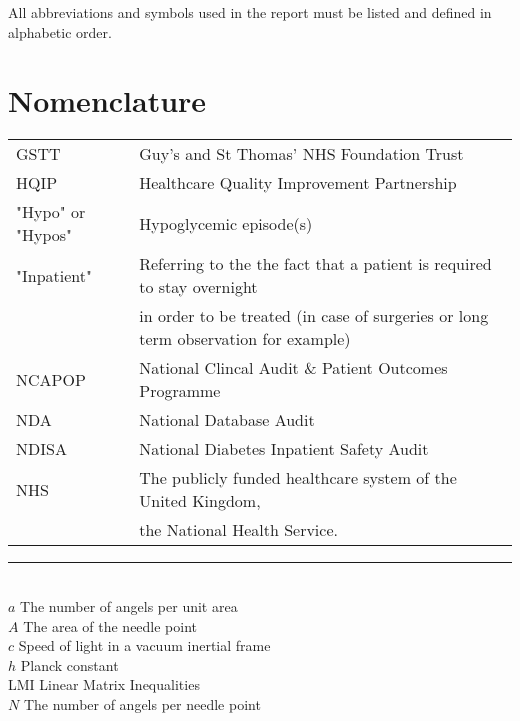  All abbreviations and symbols used in the report must be listed and defined in alphabetic order.

\section*{Nomenclature}

\begin{flushleft}
\begin{minipage}{1\textwidth}
    	\centering
        \def\arraystretch{1.25}%
    	\begin{tabular}{ll}


			GSTT  & Guy's and St Thomas' NHS Foundation Trust \\
			HQIP & Healthcare Quality Improvement Partnership \\
			"Hypo" or "Hypos" & Hypoglycemic episode(s) \\

			"Inpatient" & Referring to the the fact that a patient is required to stay overnight \\
			& in order to be treated (in case of surgeries or long term observation for example) \\ 

			NCAPOP & National Clincal Audit \& Patient Outcomes Programme \\
			NDA   & National Database Audit  \\
    		NDISA & National Diabetes Inpatient Safety Audit \\  
    		NHS & The publicly funded healthcare system of the United Kingdom, \\ 
            & the National Health Service. \\
			
      
                
    	\end{tabular}
\end{minipage}

\end{flushleft}

\noindent\rule{8cm}{0.4pt} \\ %
$a$ \qquad The number of angels per unit area\\
$A$ \qquad The area of the needle point\\
$c$ \qquad Speed of light in a vacuum inertial frame\\
$h$ \qquad Planck constant\\
LMI	\qquad Linear Matrix Inequalities\\
$N$ \qquad The number of angels per needle point